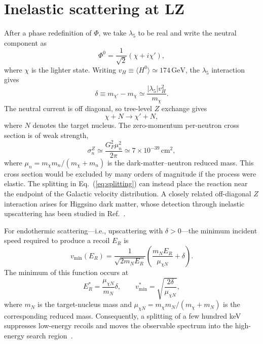 \documentclass[aps,prd,twocolumn,nofootinbib,superscriptaddress]{revtex4-2}
\newcommand{\GeV}{\,\mathrm{GeV}}
\newcommand{\cm}{\,\mathrm{cm}}
\begin{document}
\section{Inelastic scattering at LZ}

After a phase redefinition of $\Phi$, we take $\lambda_5$ to be real and write the neutral component as
%
\begin{equation}
  \Phi^0 = \frac{1}{\sqrt2}(\chi+i\chi'),
\end{equation}
%
where $\chi$ is the lighter state. Writing $v_H\equiv\langle H^0\rangle\simeq174\GeV$, the $\lambda_5$
interaction gives
\begin{equation}
  \delta\equiv m_{\chi'}-m_\chi
  \simeq\frac{|\lambda_5|v_H^2}{m_\chi}.
\label{eq:splitting}
\end{equation}
%
The neutral current is off diagonal, so tree-level $Z$ exchange gives
%
\begin{equation}
  \chi + N \longrightarrow \chi' + N,
\label{eq:inelastic-process}
\end{equation}
%
where $N$ denotes the target nucleus. The zero-momentum per-neutron cross section is of weak strength,
%
\begin{equation}
  \sigma_n^Z \simeq \frac{G_F^2 \mu_n^2}{2\pi}
  \simeq 7 \times 10^{-39}\cm^2,
\label{eq:z-cross-section}
\end{equation}
%
where $\mu_n = m_\chi m_n/(m_\chi+m_n)$ is the dark-matter--neutron reduced mass. This cross section would be excluded by many orders of magnitude if the process were elastic. The splitting in Eq.~(\ref{eq:splitting}) can instead place the reaction near the endpoint of the Galactic velocity distribution. A closely related off-diagonal $Z$ interaction arises for Higgsino dark matter, whose detection through inelastic upscattering has been studied in Ref.~\cite{Graham:2024syw}.

For endothermic scattering---i.e., upscattering with $\delta > 0$---the minimum incident speed required to produce a recoil $E_R$ is
%
\begin{equation}
  v_{\min}(E_R) = \frac{1}{\sqrt{2m_NE_R}} \left(\frac{m_NE_R}{\mu_{\chi N}}+\delta\right).
\label{eq:vmin}
\end{equation}
%
The minimum of this function occurs at
%
\begin{equation}
  E_R^* = \frac{\mu_{\chi N}}{m_N}\delta,
\qquad
  v_{\min}^* = \sqrt{\frac{2\delta}{\mu_{\chi N}}},
\label{eq:sweetspot}
\end{equation}
%
where $m_N$ is the target-nucleus mass and $\mu_{\chi N} = m_\chi m_N/(m_\chi+m_N)$ is the corresponding reduced mass. Consequently, a splitting of a few hundred keV suppresses low-energy recoils and moves the observable spectrum into the high-energy search region~\cite{An:2025bby}.
\end{document}
